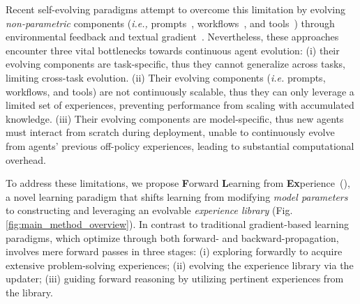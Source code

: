 Recent self-evolving paradigms attempt to overcome this limitation by evolving \textit{non-parametric} components (\textit{i.e.,} prompts~\cite{yuksekgonul2024textgrad,zhang2025agentic}, workflows~\cite{lin2025se,zhang2025multi,shang2024agentsquare}, and tools~\cite{qian2023creator,qiu2025alita}) through environmental feedback and textual gradient~\cite{yuksekgonul2024textgrad,shinn2023reflexion,zhang2024revolve}. 
Nevertheless, these approaches encounter three vital bottlenecks towards continuous agent evolution: 
(i) their evolving components are task-specific, thus they cannot generalize across tasks, limiting cross-task evolution.
(ii) Their evolving components (\textit{i.e.} prompts, workflows, and tools) are not continuously scalable, thus they can only leverage a limited set of experiences, preventing performance from scaling with accumulated knowledge.
(iii) Their evolving components are model-specific, thus new agents must interact from scratch during deployment, unable to continuously evolve from agents' previous off-policy experiences, leading to substantial computational overhead.

To address these limitations, we propose \textbf{F}orward \textbf{L}earning from \textbf{Ex}perience~(\textbf{\method{}}), a novel learning paradigm that shifts learning from modifying \textit{model parameters} to constructing and leveraging an evolvable \textit{experience library} (Fig.\ref{fig:main_method_overview}).
In contrast to traditional gradient-based learning paradigms, which optimize through both forward- and backward-propagation, \method{} involves mere forward passes in three stages: 
(i) exploring forwardly to acquire extensive problem-solving experiences;
(ii) evolving the experience library via the updater;
(iii) guiding forward reasoning by utilizing pertinent experiences from the library.

